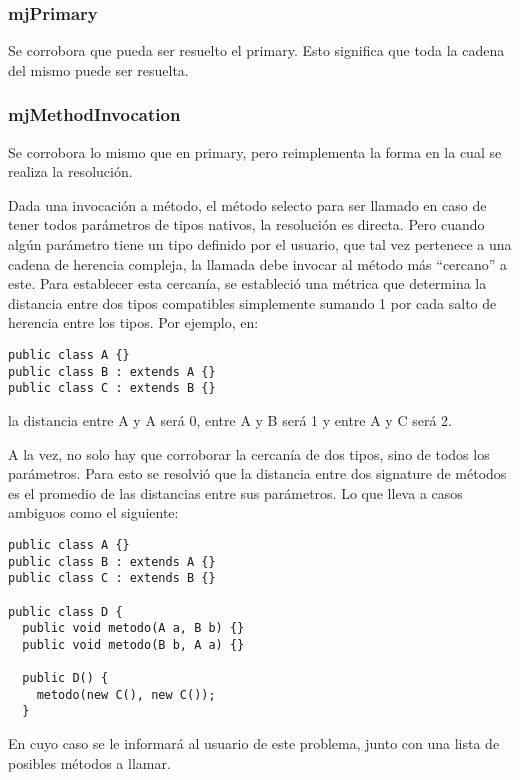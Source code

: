 \documentclass [a4paper,abstracton,titlepage]{scrartcl}
\begin{document}
  \subsubsection{mjPrimary}

Se corrobora que pueda ser resuelto el primary. Esto significa que toda la
cadena del mismo puede ser resuelta.

  \subsubsection{mjMethodInvocation}

Se corrobora lo mismo que en primary, pero reimplementa la forma en la cual se
realiza la resolución.


Dada una invocación a método, el método selecto para ser llamado en caso de tener todos parámetros de tipos nativos, la resolución es directa. Pero cuando algún parámetro tiene un tipo definido por el usuario, que tal vez pertenece a una cadena de herencia compleja, la llamada debe invocar al método más ``cercano'' a este. Para establecer esta cercanía, se estableció una métrica que determina la distancia entre dos tipos compatibles simplemente sumando 1 por cada salto de herencia entre los tipos. Por ejemplo, en:

\begin{lstlisting}
public class A {}
public class B : extends A {}
public class C : extends B {}
\end{lstlisting}

la distancia entre A y A será 0, entre A y B será 1 y entre A y C será 2.

A la vez, no solo hay que corroborar la cercanía de dos tipos, sino de todos los parámetros. Para esto se resolvió que la distancia entre dos signature de métodos es el promedio de las distancias entre sus parámetros. Lo que lleva a casos ambiguos como el siguiente:

\begin{lstlisting}
public class A {}
public class B : extends A {}
public class C : extends B {}

public class D {
  public void metodo(A a, B b) {}
  public void metodo(B b, A a) {}

  public D() {
    metodo(new C(), new C());
  }
\end{lstlisting}

En cuyo caso se le informará al usuario de este problema, junto con una lista de posibles métodos a llamar.
\end{document}
